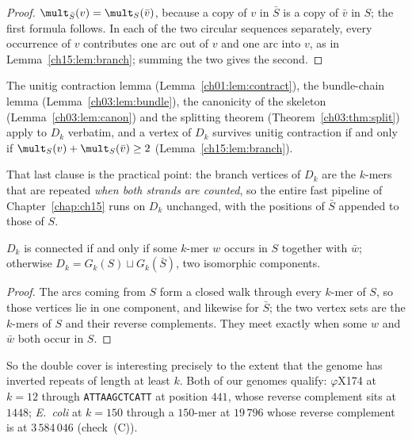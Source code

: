 \begin{proof}
$\mult_{\bar S}(v)=\mult_S(\bar v)$, because a copy of $v$ in $\bar S$ is a copy of
$\bar v$ in $S$; the first formula follows. In each of the two circular sequences
separately, every occurrence of $v$ contributes one arc out of $v$ and one arc into $v$,
as in Lemma~\ref{ch15:lem:branch}; summing the two gives the second.
\end{proof}

\begin{corollary}\label{ch05:cor:applies}
The unitig contraction lemma (Lemma~\ref{ch01:lem:contract}), the bundle-chain lemma
(Lemma~\ref{ch03:lem:bundle}), the canonicity of the skeleton (Lemma~\ref{ch03:lem:canon}) and the
splitting theorem (Theorem~\ref{ch03:thm:split}) apply to $D_k$ verbatim, and a vertex of $D_k$
survives unitig contraction if and only if $\mult_S(v)+\mult_S(\bar v)\ge2$
(Lemma~\ref{ch15:lem:branch}).
\end{corollary}

That last clause is the practical point: the branch vertices of $D_k$ are the $k$-mers
that are repeated \emph{when both strands are counted}, so the entire fast pipeline of
Chapter~\ref{chap:ch15} runs on $D_k$ unchanged, with the positions of $\bar S$ appended to those of
$S$.

\begin{proposition}\label{ch05:prop:conn}
$D_k$ is connected if and only if some $k$-mer $w$ occurs in $S$ together with $\bar w$;
otherwise $D_k=G_k(S)\sqcup G_k(\bar S)$, two isomorphic components.
\end{proposition}

\begin{proof}
The arcs coming from $S$ form a closed walk through every $k$-mer of $S$, so those
vertices lie in one component, and likewise for $\bar S$; the two vertex sets are the
$k$-mers of $S$ and their reverse complements. They meet exactly when some $w$ and
$\bar w$ both occur in $S$.
\end{proof}

So the double cover is interesting precisely to the extent that the genome has inverted
repeats of length at least $k$. Both of our genomes qualify: $\varphi$X174 at $k=12$
through \texttt{ATTAAGCTCATT} at position $441$, whose reverse complement sits at $1448$;
\emph{E.\ coli} at $k=150$ through a $150$-mer at $19\,796$ whose reverse complement is at
$3\,584\,046$ (check~(C)).

